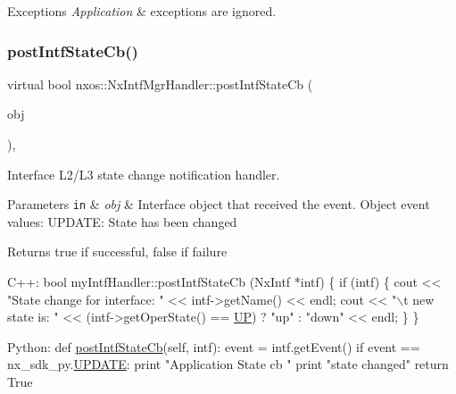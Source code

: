 \begin{DoxyExceptions}{Exceptions}
{\em Application} & exceptions are ignored. \\
\hline
\end{DoxyExceptions}
\mbox{\label{classnxos_1_1_nx_intf_mgr_handler_a9c3d4d357b1f0ab07558b4611c693755}} 
\subsubsection{\texorpdfstring{post\+Intf\+State\+Cb()}{postIntfStateCb()}}
{\footnotesize\ttfamily virtual bool nxos\+::\+Nx\+Intf\+Mgr\+Handler\+::post\+Intf\+State\+Cb (\begin{DoxyParamCaption}\item[{\mbox{\hyperlink{classnxos_1_1_nx_intf}{Nx\+Intf}} $\ast$}]{obj }\end{DoxyParamCaption})\hspace{0.3cm}{\ttfamily [inline]}, {\ttfamily [virtual]}}

Interface L2/\+L3 state change notification handler. 
\begin{DoxyParams}[1]{Parameters}
\mbox{\tt in}  & {\em obj} & Interface object that received the event. Object event values\+: U\+P\+D\+A\+TE\+: State has been changed\\
\hline
\end{DoxyParams}
\begin{DoxyReturn}{Returns}
true if successful, false if failure
\end{DoxyReturn}

\begin{DoxyCode}
C++:
    \textcolor{keywordtype}{bool}
    myIntfHandler::postIntfStateCb (NxIntf *intf)
    \{
       \textcolor{keywordflow}{if} (intf) \{
          cout << \textcolor{stringliteral}{"State change for interface: "} << 
                   intf->getName() << endl;
          cout << \textcolor{stringliteral}{"\(\backslash\)t new state is: "} << (intf->getOperState() == 
                      \mbox{\hyperlink{namespacenxos_a7c257059d03188765435b36e95dbb764a7f57fa197f0e274e5c5d10c64d0f9436}{UP}}) ? \textcolor{stringliteral}{"up"} : \textcolor{stringliteral}{"down"} << endl;
       \}
    \}

Python:   
    def \mbox{\hyperlink{classnxos_1_1_nx_intf_mgr_handler_a9c3d4d357b1f0ab07558b4611c693755}{postIntfStateCb}}(\textcolor{keyword}{self}, intf):
        event = intf.getEvent()
        if event == nx\_sdk\_py.\mbox{\hyperlink{namespacenxos_af9a9040b7681199d386e94eb888018cba4f3a5ababd9a5356d642a492f5ccc371}{UPDATE}}:
            print \textcolor{stringliteral}{"Application State cb "}
            print \textcolor{stringliteral}{"state changed"}
        return True
\end{DoxyCode}



